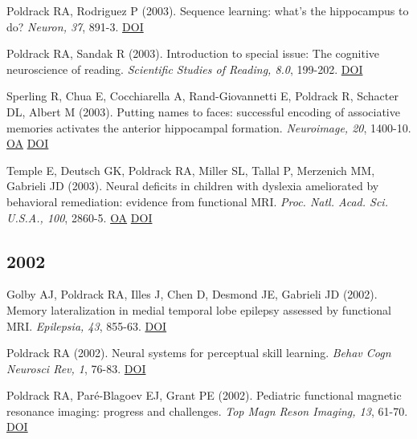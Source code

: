 Poldrack RA, Rodriguez P (2003). Sequence learning: what's the hippocampus to do? \textit{Neuron, 37}, 891-3. \href{http://dx.doi.org/10.1016/s0896-6273(03)00159-4}{DOI} \vspace{2mm}

Poldrack RA, Sandak R (2003). Introduction to special issue: The cognitive neuroscience of reading. \textit{Scientific Studies of Reading, 8.0}, 199-202. \href{http://dx.doi.org/nuwszbbp}{DOI} \vspace{2mm}

Sperling R, Chua E, Cocchiarella A, Rand-Giovannetti E, Poldrack R, Schacter DL, Albert M (2003). Putting names to faces: successful encoding of associative memories activates the anterior hippocampal formation. \textit{Neuroimage, 20}, 1400-10. \href{https://www.ncbi.nlm.nih.gov/pmc/articles/PMC3230827}{OA} \href{http://dx.doi.org/10.1016/s1053-8119(03)00391-4}{DOI} \vspace{2mm}

Temple E, Deutsch GK, Poldrack RA, Miller SL, Tallal P, Merzenich MM, Gabrieli JD (2003). Neural deficits in children with dyslexia ameliorated by behavioral remediation: evidence from functional MRI. \textit{Proc. Natl. Acad. Sci. U.S.A., 100}, 2860-5. \href{https://www.ncbi.nlm.nih.gov/pmc/articles/PMC151431}{OA} \href{http://dx.doi.org/10.1073/pnas.0030098100}{DOI} \vspace{2mm}

\subsection*{2002}

Golby AJ, Poldrack RA, Illes J, Chen D, Desmond JE, Gabrieli JD (2002). Memory lateralization in medial temporal lobe epilepsy assessed by functional MRI. \textit{Epilepsia, 43}, 855-63. \href{http://dx.doi.org/10.1046/j.1528-1157.2002.20501.x}{DOI} \vspace{2mm}

Poldrack RA (2002). Neural systems for perceptual skill learning. \textit{Behav Cogn Neurosci Rev, 1}, 76-83. \href{http://dx.doi.org/10.1177/1534582302001001005}{DOI} \vspace{2mm}

Poldrack RA, Paré-Blagoev EJ, Grant PE (2002). Pediatric functional magnetic resonance imaging: progress and challenges. \textit{Top Magn Reson Imaging, 13}, 61-70. \href{http://dx.doi.org/10.1097/00002142-200202000-00005}{DOI} \vspace{2mm}


